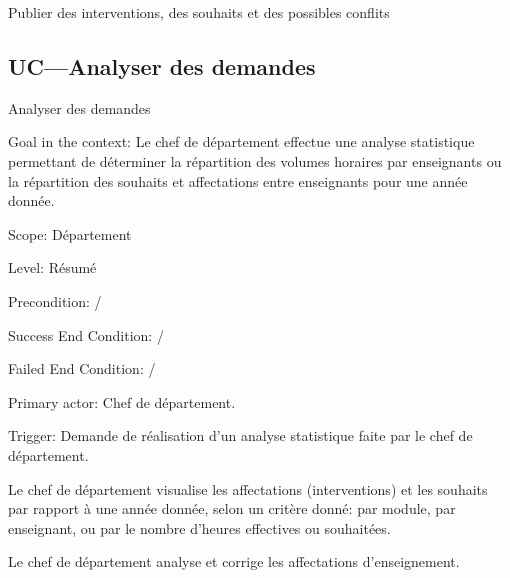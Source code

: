 \begin{ocl}
\begin{usecase}{Publier des interventions, des souhaits et des possibles conflits}
\end{usecase}

 \subsection{UC---Analyser des demandes}

\begin{usecase}{Analyser des demandes}\label{usecase:analyse}

\begin{information}
	

\item[Goal in the context:] Le chef de département effectue une analyse statistique permettant de déterminer la répartition des volumes horaires par enseignants ou la répartition des souhaits et affectations entre enseignants pour une année donnée. 

\item[Scope:] Département

\item[{Level:}] Résumé

\item[{Precondition:}]
 /

 \item[Success End Condition:]
/

 \item[Failed End Condition:]
 /

 \item[Primary actor:]
 Chef de département.

 \item[Trigger:]
 Demande de réalisation d'un analyse statistique faite par le chef de département.\\
\end{information}

\begin{scenario}
	\item Le chef de département visualise les affectations (interventions) et les souhaits par rapport à une année donnée, selon un critère donné: par module, par enseignant, ou par le nombre d'heures effectives ou souhaitées.
	\item Le chef de département analyse et corrige les affectations d'enseignement.
\end{scenario}


\end{usecase}
\end{ocl}
